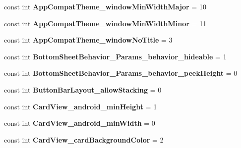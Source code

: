 \begin{DoxyCompactItemize}
const int {\bfseries App\+Compat\+Theme\+\_\+window\+Min\+Width\+Major} = 10
\item 
\mbox{\label{classXaria_1_1Resource_1_1Styleable_af1111b614484d9d3aaaebc9c316ed94d}} 
const int {\bfseries App\+Compat\+Theme\+\_\+window\+Min\+Width\+Minor} = 11
\item 
\mbox{\label{classXaria_1_1Resource_1_1Styleable_a47f3da2092894253e08b3ae30ec8b91b}} 
const int {\bfseries App\+Compat\+Theme\+\_\+window\+No\+Title} = 3
\item 
\mbox{\label{classXaria_1_1Resource_1_1Styleable_add9f781acdd32713d796743c541d1788}} 
const int {\bfseries Bottom\+Sheet\+Behavior\+\_\+\+Params\+\_\+behavior\+\_\+hideable} = 1
\item 
\mbox{\label{classXaria_1_1Resource_1_1Styleable_a6044bc69c21725ab4b486424cf3c75dc}} 
const int {\bfseries Bottom\+Sheet\+Behavior\+\_\+\+Params\+\_\+behavior\+\_\+peek\+Height} = 0
\item 
\mbox{\label{classXaria_1_1Resource_1_1Styleable_a62a99cc4c1076c0f67f0c639c3d8e2b4}} 
const int {\bfseries Button\+Bar\+Layout\+\_\+allow\+Stacking} = 0
\item 
\mbox{\label{classXaria_1_1Resource_1_1Styleable_adfe58d3354190f7606face30f6693cda}} 
const int {\bfseries Card\+View\+\_\+android\+\_\+min\+Height} = 1
\item 
\mbox{\label{classXaria_1_1Resource_1_1Styleable_aebac20d40df838b90bf16c5512004ada}} 
const int {\bfseries Card\+View\+\_\+android\+\_\+min\+Width} = 0
\item 
\mbox{\label{classXaria_1_1Resource_1_1Styleable_ae7d159b06a41ca2ff728292e01494645}} 
const int {\bfseries Card\+View\+\_\+card\+Background\+Color} = 2
\item 
\mbox{\label{classXaria_1_1Resource_1_1Styleable_a31dea23d67b190ebe154b06a8a3e3fdc}} 

\end{DoxyCompactItemize}
